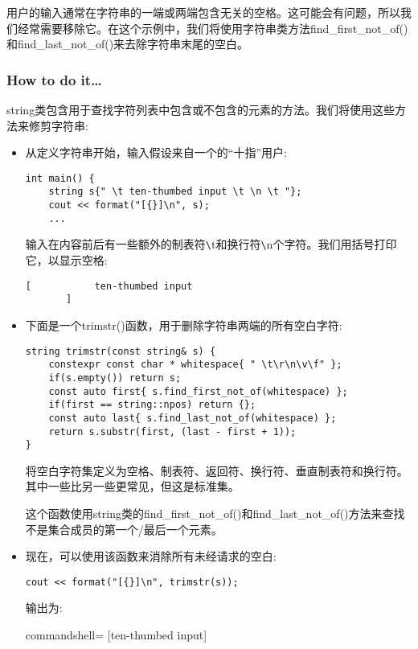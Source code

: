 
用户的输入通常在字符串的一端或两端包含无关的空格。这可能会有问题，所以我们经常需要移除它。在这个示例中，我们将使用字符串类方法find\_first\_not\_of()和find\_last\_not\_of()来去除字符串末尾的空白。

\subsubsection{How to do it…}

string类包含用于查找字符列表中包含或不包含的元素的方法。我们将使用这些方法来修剪字符串:

\begin{itemize}
\item 
从定义字符串开始，输入假设来自一个的“十指”用户:

\begin{lstlisting}[style=styleCXX]
int main() {
	string s{" \t ten-thumbed input \t \n \t "};
	cout << format("[{}]\n", s);
	...
\end{lstlisting}

输入在内容前后有一些额外的制表符\verb|\|t和换行符\verb|\|n个字符。我们用括号打印它，以显示空格:

\begin{lstlisting}[style=styleCXX]
[           ten-thumbed input
       ]
\end{lstlisting}

\item 
下面是一个trimstr()函数，用于删除字符串两端的所有空白字符:

\begin{lstlisting}[style=styleCXX]
string trimstr(const string& s) {
	constexpr const char * whitespace{ " \t\r\n\v\f" };
	if(s.empty()) return s;
	const auto first{ s.find_first_not_of(whitespace) };
	if(first == string::npos) return {};
	const auto last{ s.find_last_not_of(whitespace) };
	return s.substr(first, (last - first + 1));
}
\end{lstlisting}

将空白字符集定义为空格、制表符、返回符、换行符、垂直制表符和换行符。其中一些比另一些更常见，但这是标准集。

这个函数使用string类的find\_first\_not\_of()和find\_last\_not\_of()方法来查找不是集合成员的第一个/最后一个元素。

\item 
现在，可以使用该函数来消除所有未经请求的空白:

\begin{lstlisting}[style=styleCXX]
cout << format("[{}]\n", trimstr(s));
\end{lstlisting}

输出为:

\begin{tcblisting}{commandshell={}}
[ten-thumbed input]
\end{tcblisting}
\end{itemize}



